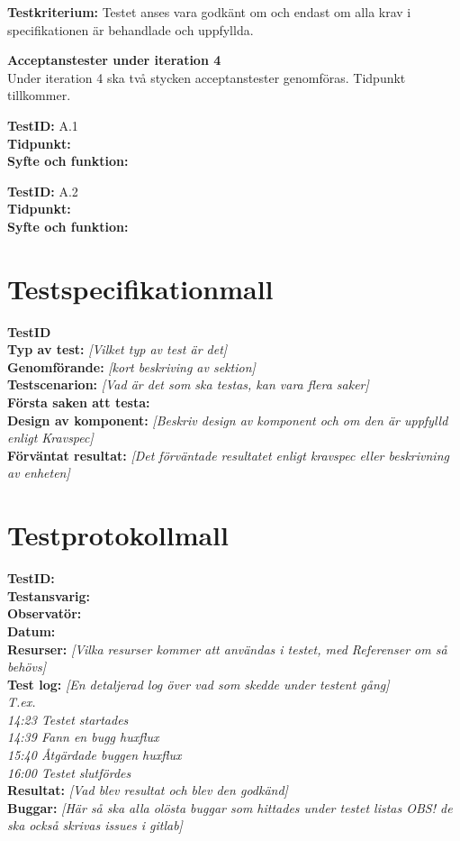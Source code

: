 \documentclass[a4paper,10pt, twoside]{article}
\begin{document}
\textbf{Testkriterium:} Testet anses vara godkänt om och endast om alla krav i specifikationen är behandlade och uppfyllda.
\clearpage

\textbf{Acceptanstester under iteration 4}
\\ Under iteration 4 ska två stycken acceptanstester genomföras. Tidpunkt tillkommer. 

	\textbf{TestID:} A.1
 \\ \textbf{Tidpunkt:}
 \\ \textbf{Syfte och funktion:} 

 	\textbf{TestID:} A.2
 \\ \textbf{Tidpunkt:}
 \\ \textbf{Syfte och funktion:}

\printbibliography

\newpage

\appendix
\section{Testspecifikationmall}
\label{sec: Testspecifikationmall}

\textbf{TestID}
\\ \textbf{Typ av test:} \emph{[Vilket typ av test är det]}
\\ \textbf{Genomförande:} \emph{[kort beskriving av sektion]}
\\ \textbf{Testscenarion:} \emph{[Vad är det som ska testas, kan vara flera saker]}
\\ \textbf{Första saken att testa:}
\\ \textbf{Design av komponent:} \emph{[Beskriv design av komponent och om den är uppfylld enligt Kravspec]}
\\ \textbf{Förväntat resultat:} \emph{[Det förväntade resultatet enligt kravspec eller beskrivning av enheten]}

\newpage

\section{Testprotokollmall}
\label{sec: Testprotokollmall}

\textbf{TestID:}
\\ \textbf{Testansvarig:\\Observatör:}
\\ \textbf{Datum:}
\\ \textbf{Resurser:} \emph{[Vilka resurser kommer att användas i testet, med Referenser om så behövs]}
\\ \textbf{Test log:} \emph{[En detaljerad log över vad som skedde under testent gång]\\ T.ex. \\ 14:23 Testet startades \\ 14:39 Fann en bugg huxflux \\ 15:40 Åtgärdade buggen huxflux \\ 16:00 Testet slutfördes}\
\\ \textbf{Resultat:} \emph{[Vad blev resultat och blev den godkänd]}
\\ \textbf{Buggar:} \emph{[Här så ska alla olösta buggar som hittades under testet listas OBS! de ska också skrivas issues i gitlab]}
\end{document}
